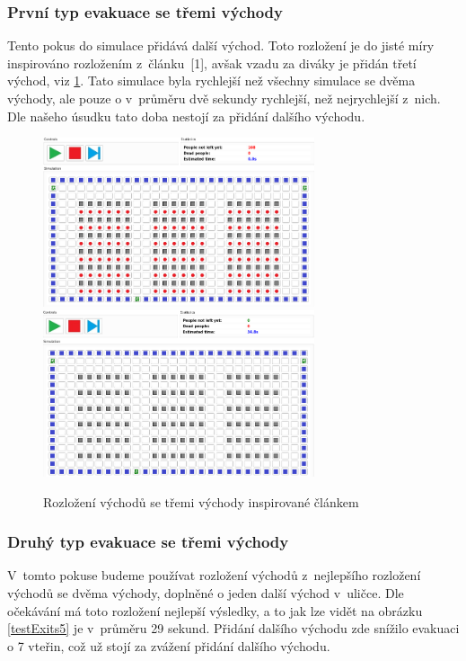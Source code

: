 \documentclass[11pt, titlepage, a4paper]{article}
\begin{document}
        \subsubsection{První typ evakuace se třemi východy}
        Tento pokus do simulace přidává další východ. Toto rozložení je do jisté míry inspirováno rozložením z~článku~[1], avšak vzadu za diváky je přidán třetí východ, viz \ref{testExits4}. Tato simulace byla rychlejší než všechny simulace se dvěma východy, ale pouze o v~průměru dvě sekundy rychlejší, než nejrychlejší z~nich. Dle našeho úsudku tato doba nestojí za přidání dalšího východu.
        
        \begin{figure}[H]
            \includegraphics[width=8cm]{ExitDistribution/ExitDistribFour}
            \includegraphics[width=8cm]{ExitDistribution/ExitDistribFourEnd}
            \caption{Rozložení východů se třemi východy inspirované článkem}
            \label{testExits4}
        \end{figure}
        
        \subsubsection{Druhý typ evakuace se třemi východy}
        V~tomto pokuse budeme používat rozložení východů z~nejlepšího rozložení východů se dvěma východy, doplněné o jeden další východ v~uličce. Dle očekávání má toto rozložení nejlepší výsledky, a to jak lze vidět na obrázku \ref{testExits5} je v~průměru 29 sekund. Přidání dalšího východu zde snížilo evakuaci o 7 vteřin, což už stojí za zvážení přidání dalšího východu.
        
\end{document}
